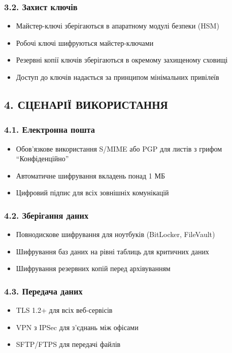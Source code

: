 \subsubsection*{3.2. Захист ключів}
\begin{itemize}
    \item Майстер-ключі зберігаються в апаратному модулі безпеки (HSM)
    \item Робочі ключі шифруються майстер-ключами
    \item Резервні копії ключів зберігаються в окремому захищеному сховищі
    \item Доступ до ключів надається за принципом мінімальних привілеїв
\end{itemize}

\subsection*{4. СЦЕНАРІЇ ВИКОРИСТАННЯ}

\subsubsection*{4.1. Електронна пошта}
\begin{itemize}
    \item Обов'язкове використання S/MIME або PGP для листів з грифом ``Конфіденційно''
    \item Автоматичне шифрування вкладень понад 1 МБ
    \item Цифровий підпис для всіх зовнішніх комунікацій
\end{itemize}

\subsubsection*{4.2. Зберігання даних}
\begin{itemize}
    \item Повнодискове шифрування для ноутбуків (BitLocker, FileVault)
    \item Шифрування баз даних на рівні таблиць для критичних даних
    \item Шифрування резервних копій перед архівуванням
\end{itemize}

\subsubsection*{4.3. Передача даних}
\begin{itemize}
    \item TLS 1.2+ для всіх веб-сервісів
    \item VPN з IPSec для з'єднань між офісами
    \item SFTP/FTPS для передачі файлів
\end{itemize}

